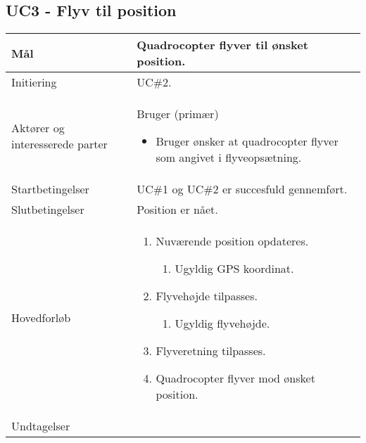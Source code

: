 \subsection*{UC3 - Flyv til position}

\begin{table}[H]
\begin{tabular}{|l|p{10cm}|}
\hline

Mål	 							& Quadrocopter flyver til ønsket position. \\\hline
Initiering 							& UC\#2. \\\hline
Aktører og interesserede parter			& Bruger (primær) 
										\begin{itemize}
											\item Bruger ønsker at quadrocopter flyver som angivet i flyveopsætning.
										\end{itemize} \\\hline
Startbetingelser							& UC\#1 og UC\#2 er succesfuld gennemført. \\\hline
Slutbetingelser						& Position er nået. \\\hline
Hovedforløb				&
 
									\renewcommand{\labelenumi}{\arabic{enumi}.}
									\renewcommand{\labelenumii}{\Roman{enumii}:}

									\begin{enumerate}[topsep=0.0cm, leftmargin=0.5cm]
										\item Nuværende position opdateres.
											\begin{enumerate}[partopsep=4cm, topsep=0cm, leftmargin=1cm]
												\item Ugyldig GPS koordinat.
											\end{enumerate}
										\item Flyvehøjde tilpasses.
											\begin{enumerate}[partopsep=4cm, topsep=0cm, leftmargin=1cm]
												\item Ugyldig flyvehøjde.
											\end{enumerate}
										\item Flyveretning tilpasses.
										\item Quadrocopter flyver mod ønsket position.
									\end{enumerate} \\\hline	

Undtagelser							& 


\end{tabular}
\end{table}
